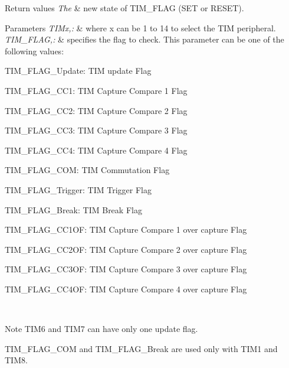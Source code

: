 \begin{DoxyRetVals}{Return values}
{\em The} & new state of T\-I\-M\-\_\-\-F\-L\-A\-G (S\-E\-T or R\-E\-S\-E\-T).\\
\hline
\end{DoxyRetVals}

\begin{DoxyParams}{Parameters}
{\em T\-I\-Mx,\-:} & where x can be 1 to 14 to select the T\-I\-M peripheral. \\
\hline
{\em T\-I\-M\-\_\-\-F\-L\-A\-G,\-:} & specifies the flag to check. This parameter can be one of the following values\-: \begin{DoxyItemize}
\item T\-I\-M\-\_\-\-F\-L\-A\-G\-\_\-\-Update\-: T\-I\-M update Flag \item T\-I\-M\-\_\-\-F\-L\-A\-G\-\_\-\-C\-C1\-: T\-I\-M Capture Compare 1 Flag \item T\-I\-M\-\_\-\-F\-L\-A\-G\-\_\-\-C\-C2\-: T\-I\-M Capture Compare 2 Flag \item T\-I\-M\-\_\-\-F\-L\-A\-G\-\_\-\-C\-C3\-: T\-I\-M Capture Compare 3 Flag \item T\-I\-M\-\_\-\-F\-L\-A\-G\-\_\-\-C\-C4\-: T\-I\-M Capture Compare 4 Flag \item T\-I\-M\-\_\-\-F\-L\-A\-G\-\_\-\-C\-O\-M\-: T\-I\-M Commutation Flag \item T\-I\-M\-\_\-\-F\-L\-A\-G\-\_\-\-Trigger\-: T\-I\-M Trigger Flag \item T\-I\-M\-\_\-\-F\-L\-A\-G\-\_\-\-Break\-: T\-I\-M Break Flag \item T\-I\-M\-\_\-\-F\-L\-A\-G\-\_\-\-C\-C1\-O\-F\-: T\-I\-M Capture Compare 1 over capture Flag \item T\-I\-M\-\_\-\-F\-L\-A\-G\-\_\-\-C\-C2\-O\-F\-: T\-I\-M Capture Compare 2 over capture Flag \item T\-I\-M\-\_\-\-F\-L\-A\-G\-\_\-\-C\-C3\-O\-F\-: T\-I\-M Capture Compare 3 over capture Flag \item T\-I\-M\-\_\-\-F\-L\-A\-G\-\_\-\-C\-C4\-O\-F\-: T\-I\-M Capture Compare 4 over capture Flag\end{DoxyItemize}
\\
\hline
\end{DoxyParams}
\begin{DoxyNote}{Note}
T\-I\-M6 and T\-I\-M7 can have only one update flag. 

T\-I\-M\-\_\-\-F\-L\-A\-G\-\_\-\-C\-O\-M and T\-I\-M\-\_\-\-F\-L\-A\-G\-\_\-\-Break are used only with T\-I\-M1 and T\-I\-M8.
\end{DoxyNote}

